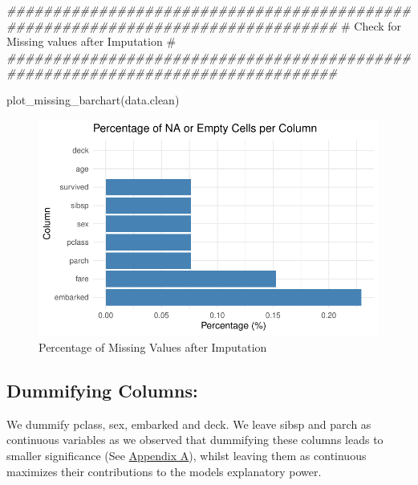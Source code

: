 \documentclass[
  letterpaper,
  DIV=11,
  numbers=noendperiod]{scrartcl}
\newenvironment{Shaded}{\begin{snugshade}}{\end{snugshade}}
\newcommand{\CommentTok}[1]{\textcolor[rgb]{0.37,0.37,0.37}{#1}}
\newcommand{\DocumentationTok}[1]{\textcolor[rgb]{0.37,0.37,0.37}{\textit{#1}}}
\newcommand{\FunctionTok}[1]{\textcolor[rgb]{0.28,0.35,0.67}{#1}}
\newcommand{\NormalTok}[1]{\textcolor[rgb]{0.00,0.23,0.31}{#1}}
\begin{document}
\begin{Shaded}
\begin{Highlighting}[]
\DocumentationTok{\#\#\#\#\#\#\#\#\#\#\#\#\#\#\#\#\#\#\#\#\#\#\#\#\#\#\#\#\#\#\#\#\#\#\#\#\#\#\#\#\#\#\#\#\#\#\#\#\#\#\#\#\#\#\#\#\#\#\#\#\#\#\#\#\#\#\#\#\#\#\#\#\#\#\#\#\#\#\#\#}
\CommentTok{\#          Check for Missing values after Imputation                           \#}
\DocumentationTok{\#\#\#\#\#\#\#\#\#\#\#\#\#\#\#\#\#\#\#\#\#\#\#\#\#\#\#\#\#\#\#\#\#\#\#\#\#\#\#\#\#\#\#\#\#\#\#\#\#\#\#\#\#\#\#\#\#\#\#\#\#\#\#\#\#\#\#\#\#\#\#\#\#\#\#\#\#\#\#\#}

\FunctionTok{plot\_missing\_barchart}\NormalTok{(data.clean)}
\end{Highlighting}
\end{Shaded}

\begin{figure}[H]

{\centering \includegraphics{FinalProject_files/figure-pdf/unnamed-chunk-6-1.pdf}

}

\caption{Percentage of Missing Values after Imputation}

\end{figure}%

\subsection{Dummifying Columns:}\label{dummifying-columns}

We dummify pclass, sex, embarked and deck. We leave sibsp and parch as
continuous variables as we observed that dummifying these columns leads
to smaller significance (See \hyperref[appendix_A]{Appendix A}), whilst
leaving them as continuous maximizes their contributions to the models
explanatory power.
\end{document}
